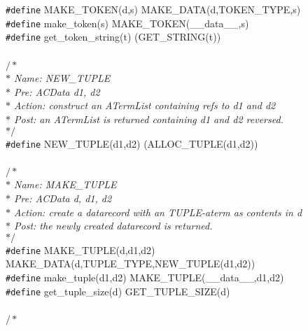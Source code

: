 \begin{flushleft}
{\tt \#define} MAKE\_TOKEN(d,s) MAKE\_DATA(d,TOKEN\_TYPE,s)\mbox{}\\
{\tt \#define} make\_token(s) MAKE\_TOKEN(\_\_data\_\_,s)\mbox{}\\
{\tt \#define} get\_token\_string(t) (GET\_STRING(t))\mbox{}\\
\mbox{}\\
{$/\ast$\it{}\mbox{}\\
\hspace*{1\indentation}$\ast$ Name: NEW\_TUPLE\mbox{}\\
\hspace*{1\indentation}$\ast$ Pre: ACData d1, d2\mbox{}\\
\hspace*{1\indentation}$\ast$ Action: construct an ATermList containing refs to d1 and d2\mbox{}\\
\hspace*{1\indentation}$\ast$ Post: an ATermList is returned containing d1 and d2 reversed.\mbox{}\\
\hspace*{1\indentation}$\ast/$}\mbox{}\\
{\tt \#define} NEW\_TUPLE(d1,d2) (ALLOC\_TUPLE(d1,d2))\mbox{}\\
\mbox{}\\
{$/\ast$\it{}\mbox{}\\
\hspace*{1\indentation}$\ast$ Name: MAKE\_TUPLE\mbox{}\\
\hspace*{1\indentation}$\ast$ Pre: ACData d, d1, d2\mbox{}\\
\hspace*{1\indentation}$\ast$ Action: create a datarecord with an TUPLE-aterm as contents in d\mbox{}\\
\hspace*{1\indentation}$\ast$ Post: the newly created datarecord is returned.\mbox{}\\
\hspace*{1\indentation}$\ast/$}\mbox{}\\
{\tt \#define} MAKE\_TUPLE(d,d1,d2) MAKE\_DATA(d,TUPLE\_TYPE,NEW\_TUPLE(d1,d2))\mbox{}\\
{\tt \#define} make\_tuple(d1,d2) MAKE\_TUPLE(\_\_data\_\_,d1,d2)\mbox{}\\
{\tt \#define} get\_tuple\_size(d) GET\_TUPLE\_SIZE(d)\mbox{}\\
\mbox{}\\
{$/\ast$\it{}\mbox{}\\
}
\end{flushleft}

